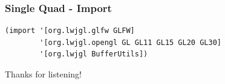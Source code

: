 \documentclass[aspectratio=169,11pt,xcolor=dvipsnames]{beamer}
\begin{document}
\begin{frame}[fragile]
  \frametitle{Single Quad {-} Import}
  \begin{verbatim}
(import '[org.lwjgl.glfw GLFW]
        '[org.lwjgl.opengl GL GL11 GL15 GL20 GL30]
        '[org.lwjgl BufferUtils])
  \end{verbatim}
\end{frame}

\begin{frame}
  \begin{center}
    \begin{huge}
      Thanks for listening!
    \end{huge}
  \end{center}
\end{frame}
\end{document}
